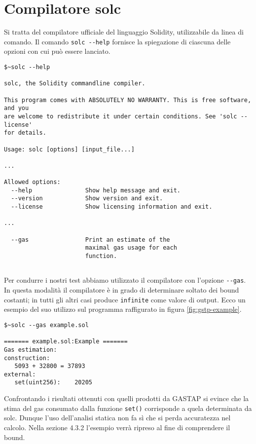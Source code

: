     
\section{Compilatore solc}

Si tratta del compilatore ufficiale del linguaggio Solidity, utilizzabile da linea di comando.\newline
\indent Il comando \verb|solc --help| fornisce la spiegazione di ciascuna delle opzioni con cui può essere lanciato.


\begin{lstlisting}
$~solc --help

solc, the Solidity commandline compiler.

This program comes with ABSOLUTELY NO WARRANTY. This is free software, and you
are welcome to redistribute it under certain conditions. See 'solc --license'
for details.

Usage: solc [options] [input_file...]

...

Allowed options:
  --help               Show help message and exit.
  --version            Show version and exit.
  --license            Show licensing information and exit.
    
...

  --gas                Print an estimate of the  
                       maximal gas usage for each 
                       function. 
 
\end{lstlisting}



Per condurre i nostri test abbiamo utilizzato il compilatore con l'opzione \verb|--gas|. In questa modalità il compilatore è in grado di determinare soltato dei bound costanti; in tutti gli altri casi produce \verb|infinite| come valore di output.\newline 
\indent Ecco un esempio del suo utilizzo sul programma raffigurato in figura \ref{fig:gstp-example}.

\begin{minipage}{\linewidth}
\begin{lstlisting}
$~solc --gas example.sol 

======= example.sol:Example =======
Gas estimation:
construction:
   5093 + 32800 = 37893
external:
   set(uint256):	20205

\end{lstlisting}
\end{minipage}


Confrontando i risultati ottenuti con quelli prodotti da GASTAP si evince che la stima del gas consumato dalla funzione \verb|set()| corrisponde a quela determinata da solc. Dunque l'uso dell'analisi statica non fa sì che si perda accuratezza nel calcolo.\newline
\indent Nella sezione 4.3.2 l'esempio verrà ripreso al fine di comprendere il bound.\newline
